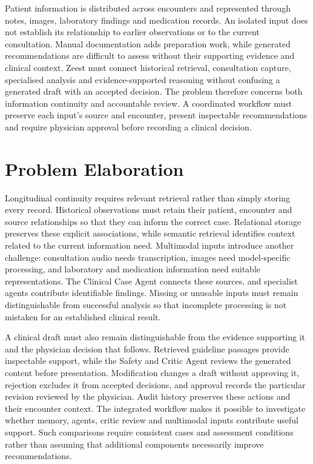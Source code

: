 Patient information is distributed across encounters and represented through notes, images, laboratory findings and medication records. An isolated input does not establish its relationship to earlier observations or to the current consultation. Manual documentation adds preparation work, while generated recommendations are difficult to assess without their supporting evidence and clinical context. Zeest must connect historical retrieval, consultation capture, specialised analysis and evidence-supported reasoning without confusing a generated draft with an accepted decision. The problem therefore concerns both information continuity and accountable review. A coordinated workflow must preserve each input's source and encounter, present inspectable recommendations and require physician approval before recording a clinical decision.

\section{Problem Elaboration}

Longitudinal continuity requires relevant retrieval rather than simply storing every record. Historical observations must retain their patient, encounter and source relationships so that they can inform the correct case. Relational storage preserves these explicit associations, while semantic retrieval identifies context related to the current information need. Multimodal inputs introduce another challenge: consultation audio needs transcription, images need model-specific processing, and laboratory and medication information need suitable representations. The Clinical Case Agent connects these sources, and specialist agents contribute identifiable findings. Missing or unusable inputs must remain distinguishable from successful analysis so that incomplete processing is not mistaken for an established clinical result.

A clinical draft must also remain distinguishable from the evidence supporting it and the physician decision that follows. Retrieved guideline passages provide inspectable support, while the Safety and Critic Agent reviews the generated content before presentation. Modification changes a draft without approving it, rejection excludes it from accepted decisions, and approval records the particular revision reviewed by the physician. Audit history preserves these actions and their encounter context. The integrated workflow makes it possible to investigate whether memory, agents, critic review and multimodal inputs contribute useful support. Such comparisons require consistent cases and assessment conditions rather than assuming that additional components necessarily improve recommendations.

